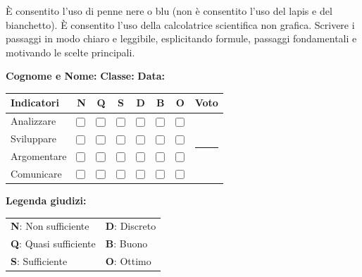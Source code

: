 \documentclass[a4paper,10pt]{exam}
\makeatletter
\newcommand{\cbox}{\ensuremath{\vcenter{\hbox{\tikz{\draw[black!75, line width=0.5pt, rounded corners=1.2pt] (0,0) rectangle (3.0mm, 3.0mm);}}}}}
\newcommand{\grigliacompetenze}{
\vspace{1mm}
\noindent
\begin{minipage}[c]{0.62\linewidth}
\footnotesize
\setlength{\aboverulesep}{0pt}
\setlength{\belowrulesep}{0pt}
\renewcommand{\arraystretch}{1.25}
\begin{tabular}{l cc >{\columncolor{gray!20}}c ccc c}
\toprule
\rowcolor{gray!10}
\textbf{Indicatori} & \textbf{N} & \textbf{Q} & \cellcolor{gray!20}\textbf{S} & \textbf{D} & \textbf{B} & \textbf{O} & \textbf{Voto} \\
\midrule
Analizzare    & \cbox & \cbox & \cbox & \cbox & \cbox & \cbox & \multirow{4}{*}{\rule{1.4cm}{0pt}} \\
Sviluppare    & \cbox & \cbox & \cbox & \cbox & \cbox & \cbox & \\
Argomentare   & \cbox & \cbox & \cbox & \cbox & \cbox & \cbox & \\
Comunicare    & \cbox & \cbox & \cbox & \cbox & \cbox & \cbox & \\
\bottomrule
\end{tabular}
\end{minipage}\hfill
\begin{minipage}[c]{0.35\linewidth}
\scriptsize \color{black!75}
\textbf{Legenda giudizi:}\par\vspace{1mm}
\begin{tabular}{@{}ll@{}}
\textbf{N}: Non sufficiente & \textbf{D}: Discreto \\
\textbf{Q}: Quasi sufficiente & \textbf{B}: Buono \\
\textbf{S}: Sufficiente & \textbf{O}: Ottimo \\
\end{tabular}
\end{minipage}
}
\newcommand{\supportiprova}[1]{%
  \par\noindent\begin{minipage}{\linewidth}\small
  #1
  \end{minipage}\par\vspace{3mm}%
}
\makeatother
\begin{document}
\begin{tcolorbox}[istruzionibox]
È consentito l'uso di penne nere o blu (non è consentito l'uso del lapis e del bianchetto).
È consentito l'uso della calcolatrice scientifica non grafica.
Scrivere i passaggi in modo chiaro e leggibile, esplicitando formule, passaggi fondamentali e motivando le scelte principali.
\end{tcolorbox}

\vspace{1.5mm}

\null
\vfill

\noindent
\textbf{Cognome e Nome:}\enspace\hrulefill\hspace{1cm}%
\textbf{Classe:}\enspace\makebox[2.5cm]{\hrulefill}\hspace{1cm}%
\textbf{Data:}\enspace\makebox[2.5cm]{\hrulefill}

\vspace{3mm}
\grigliacompetenze
\end{document}
